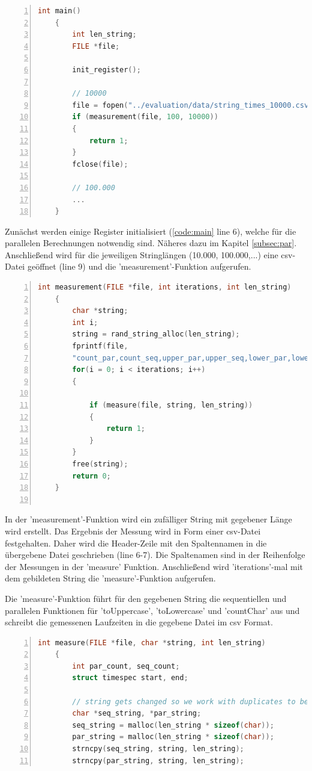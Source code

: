\documentclass[plainarticle,zihtitle,german,final,hyperref,utf8]{zihpub}
\begin{document}
\begin{lstlisting}[language=c, numbers=left]
	int main()
	{
		int len_string; 	
		FILE *file;
		
		init_register();
		
		// 10000
		file = fopen("../evaluation/data/string_times_10000.csv", "w");
		if (measurement(file, 100, 10000))
		{
			return 1;
		}
		fclose(file);
		
		// 100.000
		...
	}
\end{lstlisting}
\label{code:main}

Zunächst werden einige Register initialisiert (\ref{code:main} line 6), welche für die parallelen Berechnungen notwendig sind. Näheres dazu im Kapitel \ref{subsec:par}. Anschließend wird für die jeweiligen Stringlängen (10.000, 100.000,...) eine csv-Datei geöffnet (line 9) und die 'measurement'-Funktion aufgerufen.

\begin{lstlisting}[language=c, numbers=left]
	int measurement(FILE *file, int iterations, int len_string)
	{
		char *string;
		int i;
		string = rand_string_alloc(len_string);
		fprintf(file,
		"count_par,count_seq,upper_par,upper_seq,lower_par,lower_seq\n");
		for(i = 0; i < iterations; i++)
		{
			
			if (measure(file, string, len_string))
			{
				return 1;
			}
		}
		free(string);
		return 0;
	}
	
\end{lstlisting}

In der 'measurement'-Funktion wird ein zufälliger String mit gegebener Länge wird erstellt.
Das Ergebnis der Messung wird in Form einer csv-Datei festgehalten. Daher wird die Header-Zeile mit den Spaltennamen in die übergebene Datei geschrieben (line 6-7). Die Spaltenamen sind in der Reihenfolge der Messungen in der 'measure' Funktion.
Anschließend wird 'iterations'-mal mit dem gebildeten String die 'measure'-Funktion aufgerufen.

Die 'measure'-Funktion führt für den gegebenen String die sequentiellen und parallelen Funktionen für 'toUppercase', 'toLowercase' und 'countChar' aus und schreibt die gemessenen Laufzeiten in die gegebene Datei im csv Format.
\begin{lstlisting}[language=c, numbers=left]
	int measure(FILE *file, char *string, int len_string)
	{
		int par_count, seq_count;
		struct timespec start, end;
		
		// string gets changed so we work with duplicates to be able to reset
		char *seq_string, *par_string;
		seq_string = malloc(len_string * sizeof(char));
		par_string = malloc(len_string * sizeof(char));
		strncpy(seq_string, string, len_string);
		strncpy(par_string, string, len_string);
\end{lstlisting}
\end{document}
